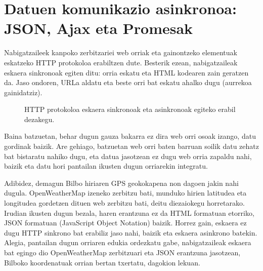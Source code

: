 \chapter{Datuen komunikazio asinkronoa: JSON, Ajax eta Promesak}

Nabigatzaileek kanpoko zerbitzariei web orriak eta gainontzeko elementuak eskatzeko HTTP protokoloa erabiltzen dute. Besterik ezean, nabigatzaileak eskaera sinkronoak egiten ditu: orria eskatu eta HTML kodearen zain geratzen da. Jaso ondoren, URLa aldatu eta beste orri bat eskatu ahalko dugu (aurrekoa gainidatziz).

\begin{figure}[ht]
	\centering
{}
\caption{HTTP protokoloa eskaera sinkronoak eta asinkronoak egiteko erabil dezakegu.}
\label{fig:http-protocol}
\end{figure}

Baina batzuetan, behar dugun gauza bakarra ez dira web orri osoak izango, datu gordinak baizik. Are gehiago, batzuetan web orri baten barruan soilik datu zehatz bat bistaratu nahiko dugu, eta datua jasotzean ez dugu web orria zapaldu nahi, baizik eta datu hori pantailan ikusten dugun orriarekin integratu.

Adibidez, demagun Bilbo hiriaren GPS geokokapena non dagoen jakin nahi dugula. OpenWeatherMap izeneko zerbitzu bati, munduko hirien latitudea eta longitudea gordetzen dituen web zerbitzu bati, deitu diezaiokegu horretarako. Irudian ikusten dugun bezala, haren erantzuna ez da HTML formatuan etorriko, JSON formatuan (JavaScript Object Notation) baizik. Horrez gain, eskaera ez dugu HTTP sinkrono bat erabiliz jaso nahi, baizik eta eskaera asinkrono batekin. Alegia, pantailan dugun orriaren edukia ordezkatu gabe, nabigatzaileak eskaera bat egingo dio OpenWeatherMap zerbitzuari eta JSON erantzuna jasotzean, Bilboko koordenatuak orrian bertan txertatu, dagokion lekuan.

